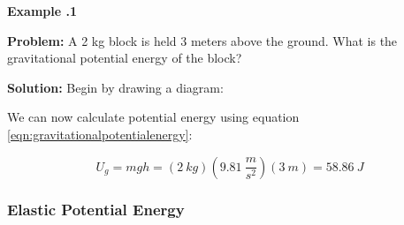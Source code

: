 	
 	\begin{mdframed}[backgroundcolor=blue!10!white]
 	\begin{center}
 		
 		
 		\textbf{Example \thesection.1}	
 	\end{center}
 	
 	\textbf{Problem: } A 2 kg block is held 3 meters above the ground. What is the gravitational potential energy of the block?
 	\vspace{0.1in}
 	
 	\textbf{Solution:} 
 	Begin by drawing a diagram:
 	\vspace{0.1in}
 	\begin{center}
 		
 		We can now calculate potential energy using equation \eqref{eqn:gravitationalpotentialenergy}:
 		
 		\begin{equation*}
 			U_g = mgh = (\SI{2}{kg})(\SI{9.81}{\frac{m}{s^2}})(\SI{3}{m}) = \SI{58.86}{J} 
 		\end{equation*}
 		
 	\end{center}
 	
\end{mdframed}
 	
	
	
	
	\subsubsection{Elastic Potential Energy}  
	
